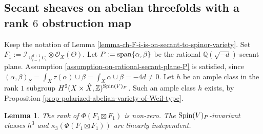 \documentclass[12pt]{amsart}
\numberwithin{equation}{subsection}
\theoremstyle{plain}
\newtheorem{lem}[thm]{Lemma}
\theoremstyle{definition}
\newcommand{\QQ}{{\mathbb Q}}
\newcommand{\ZZ}{{\mathbb Z}}
\newcommand{\Spin}{{\rm Spin}}
\newcommand{\StructureSheaf}[1]{{\mathcal O}_{#1}}
\newcommand{\Ideal}[1]{{\mathcal I}_{#1}}
\renewcommand{\span}{{\rm span}}
\begin{document}
% 
\subsection{Secant sheaves on abelian threefolds  with a rank $6$ obstruction map}
\label{sec-rank-6-obstruction-map}
Keep the notation of Lemma \ref{lemma-ch-F-i-is-on-secant-to-spinor-variety}.
Set $F_1:=\Ideal{\cup_{i=1}^{d+1}C_i}\otimes\StructureSheaf{X}(\Theta)$. Let $P:=\span\{\alpha,\beta\}$ be the rational $\QQ(\sqrt{-d})$-secant plane.
Assumption \ref{assumption-on-rational-secant-plane-P} is satisfied, since $(\alpha,\beta)_S=\int_X\tau(\alpha)\cup\beta=\int_X\alpha\cup\beta=-4d\neq 0.$
Let $h$ be an ample class in the rank $1$ subgroup $H^2(X\times\hat{X},\ZZ)^{\Spin(V)_P}$. Such an ample class $h$ exists, by Proposition \ref{prop-polarized-abelian-variety-of-Weil-type}.

\begin{lem}
\label{lemma-kappa-3-is-linearly-independent-from-h-cube}
The rank of $\Phi(F_1\boxtimes F_1)$ is non-zero.
The $\Spin(V)_P$-invariant classes $h^3$ and $\kappa_3(\Phi(F_1\boxtimes F_1))$ are linearly independent.
\end{lem}
\end{document}
